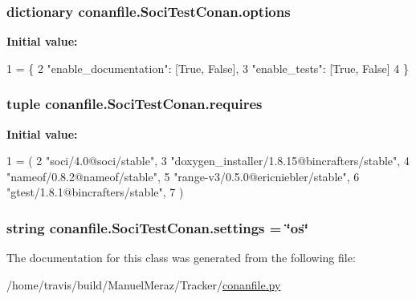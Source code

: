 \subsubsection[{\texorpdfstring{options}{options}}]{\setlength{\rightskip}{0pt plus 5cm}dictionary conanfile.\+Soci\+Test\+Conan.\+options\hspace{0.3cm}{\ttfamily [static]}}\hypertarget{classconanfile_1_1_soci_test_conan_ab781692f9ac51676c406468e630c2c94}{}\label{classconanfile_1_1_soci_test_conan_ab781692f9ac51676c406468e630c2c94}
{\bfseries Initial value\+:}
\begin{DoxyCode}
1 = \{
2         \textcolor{stringliteral}{"enable\_documentation"}: [\textcolor{keyword}{True}, \textcolor{keyword}{False}],
3         \textcolor{stringliteral}{"enable\_tests"}: [\textcolor{keyword}{True}, \textcolor{keyword}{False}]
4     \}
\end{DoxyCode}
\subsubsection[{\texorpdfstring{requires}{requires}}]{\setlength{\rightskip}{0pt plus 5cm}tuple conanfile.\+Soci\+Test\+Conan.\+requires\hspace{0.3cm}{\ttfamily [static]}}\hypertarget{classconanfile_1_1_soci_test_conan_a6616d9e2f2f7ee2698f83b7deeeb03fd}{}\label{classconanfile_1_1_soci_test_conan_a6616d9e2f2f7ee2698f83b7deeeb03fd}
{\bfseries Initial value\+:}
\begin{DoxyCode}
1 = (
2         \textcolor{stringliteral}{"soci/4.0@soci/stable"},
3         \textcolor{stringliteral}{"doxygen\_installer/1.8.15@bincrafters/stable"},
4         \textcolor{stringliteral}{"nameof/0.8.2@nameof/stable"},
5         \textcolor{stringliteral}{"range-v3/0.5.0@ericniebler/stable"},
6         \textcolor{stringliteral}{"gtest/1.8.1@bincrafters/stable"},
7     )
\end{DoxyCode}
\subsubsection[{\texorpdfstring{settings}{settings}}]{\setlength{\rightskip}{0pt plus 5cm}string conanfile.\+Soci\+Test\+Conan.\+settings = \char`\"{}os\char`\"{}\hspace{0.3cm}{\ttfamily [static]}}\hypertarget{classconanfile_1_1_soci_test_conan_adf4d0f9bb782dcafbfdd9375cf7a8f54}{}\label{classconanfile_1_1_soci_test_conan_adf4d0f9bb782dcafbfdd9375cf7a8f54}


The documentation for this class was generated from the following file\+:\begin{DoxyCompactItemize}
\item 
/home/travis/build/\+Manuel\+Meraz/\+Tracker/\hyperlink{conanfile_8py}{conanfile.\+py}\end{DoxyCompactItemize}

